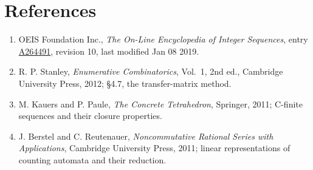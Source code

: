 \documentclass[11pt]{article}
\theoremstyle{definition}
\begin{document}
\section{References}

\begin{enumerate}

\item OEIS Foundation Inc., \emph{The On-Line Encyclopedia of Integer Sequences}, entry \href{https://oeis.org/A264491}{A264491}, revision 10, last modified Jan 08 2019.

\item R. P. Stanley, \emph{Enumerative Combinatorics}, Vol.~1, 2nd ed., Cambridge University Press, 2012; \S4.7, the transfer-matrix method.

\item M. Kauers and P. Paule, \emph{The Concrete Tetrahedron}, Springer, 2011; C-finite sequences and their closure properties.

\item J. Berstel and C. Reutenauer, \emph{Noncommutative Rational Series with Applications}, Cambridge University Press, 2011; linear representations of counting automata and their reduction.

\end{enumerate}
\end{document}
